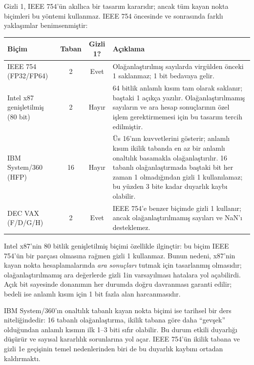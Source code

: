 \begin{bilginot}
Gizli 1, IEEE 754'ün akıllıca bir tasarım kararıdır; ancak tüm kayan nokta biçimleri bu yöntemi kullanmaz. IEEE 754 öncesinde ve sonrasında farklı yaklaşımlar benimsenmiştir:

\begin{center}
\small
\begin{tabularx}{\textwidth}{l c c X}
\toprule
\textbf{Biçim} & \textbf{Taban} & \textbf{Gizli 1?} & \textbf{Açıklama} \\
\midrule
IEEE 754 (FP32/FP64) & 2 & Evet & Olağanlaştırılmış sayılarda virgülden önceki 1 saklanmaz; 1 bit bedavaya gelir. \\[3pt]
Intel x87 genişletilmiş (80 bit) & 2 & Hayır & 64 bitlik anlamlı kısım tam olarak saklanır; baştaki 1 açıkça yazılır. Olağanlaştırılmamış sayıların ve ara hesap sonuçlarının özel işlem gerektirmemesi için bu tasarım tercih edilmiştir. \\[3pt]
IBM System/360 (HFP) & 16 & Hayır & Üs 16'nın kuvvetlerini gösterir; anlamlı kısım ikilik tabanda en az bir anlamlı onaltılık basamakla olağanlaştırılır. 16 tabanlı olağanlaştırmada baştaki bit her zaman 1 olmadığından gizli 1 kullanılamaz; bu yüzden 3 bite kadar duyarlık kaybı olabilir. \\[3pt]
DEC VAX (F/D/G/H) & 2 & Evet & IEEE 754'e benzer biçimde gizli 1 kullanır; ancak olağanlaştırılmamış sayıları ve NaN'ı desteklemez. \\
\bottomrule
\end{tabularx}
\end{center}

Intel x87'nin 80 bitlik genişletilmiş biçimi özellikle ilginçtir: bu biçim IEEE 754'ün bir parçası olmasına rağmen gizli 1 kullanmaz. Bunun nedeni, x87'nin kayan nokta hesaplamalarında \emph{ara sonuçları} tutmak için tasarlanmış olmasıdır; olağanlaştırılmamış ara değerlerde gizli 1in varsayılması hatalara yol açabilirdi. Açık bit sayesinde donanımın her durumda doğru davranması garanti edilir; bedeli ise anlamlı kısım için 1 bit fazla alan harcanmasıdır.

IBM System/360'ın onaltılık tabanlı kayan nokta biçimi ise tarihsel bir ders niteliğindedir: 16 tabanlı olağanlaştırma, ikilik tabana göre daha ``gevşek'' olduğundan anlamlı kısmın ilk 1--3 biti sıfır olabilir. Bu durum etkili duyarlığı düşürür ve sayısal kararlılık sorunlarına yol açar. IEEE 754'ün ikilik tabana ve gizli 1e geçişinin temel nedenlerinden biri de bu duyarlık kaybını ortadan kaldırmaktı.
\end{bilginot}


